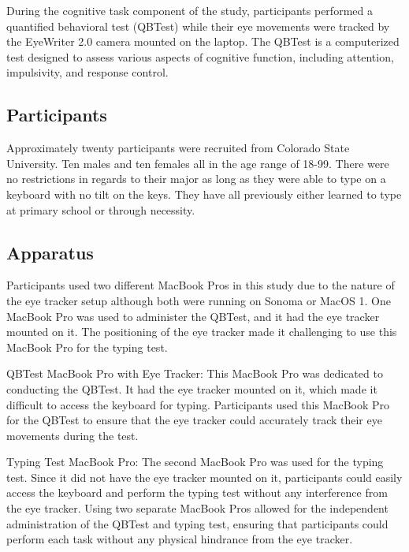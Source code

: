\documentclass[manuscript, screen, review]{acmart} %
\begin{document}
During the cognitive task component of the study, participants performed a quantified behavioral test (QBTest) while their eye movements were tracked by the EyeWriter 2.0 camera mounted on the laptop. The QBTest is a computerized test designed to assess various aspects of cognitive function, including attention, impulsivity, and response control.

\subsection[short]{Participants}
Approximately twenty participants were recruited from Colorado State University. Ten males and ten females all in the age range of 18-99. There were no %
restrictions in regards to their major as long as they were able to type on a keyboard with no tilt on the keys.
They have all previously either learned to type at primary school or through necessity.

\subsection[short]{Apparatus}  %
Participants used two different MacBook Pros in this study due to the nature of the eye tracker setup although both were running on Sonoma or MacOS 1. One MacBook Pro was used to administer the QBTest, and it had the eye tracker mounted on it. The positioning of the eye tracker made it challenging to use this MacBook Pro for the typing test. 

QBTest MacBook Pro with Eye Tracker: This MacBook Pro was dedicated to conducting the QBTest. It had the eye tracker mounted on it, which made it difficult to access the keyboard for typing. Participants used this MacBook Pro for the QBTest to ensure that the eye tracker could accurately track their eye movements during the test.

Typing Test MacBook Pro: The second MacBook Pro was used for the typing test. Since it did not have the eye tracker mounted on it, participants could easily access the keyboard and perform the typing test without any interference from the eye tracker.
Using two separate MacBook Pros allowed for the independent administration of the QBTest and typing test, ensuring that participants could perform each task without any physical hindrance from the eye tracker.
\end{document}
